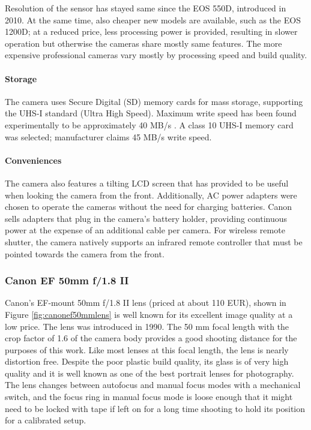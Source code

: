 Resolution of the sensor has stayed same since the EOS 550D, introduced in 2010.
At the same time, also cheaper new models are available, such as the EOS 1200D; at a reduced price, less processing power is provided, resulting in slower operation but otherwise the cameras share mostly same features.
The more expensive professional cameras vary mostly by processing speed and build quality.

\paragraph{Storage}
The camera uses Secure Digital (SD) memory cards for mass storage, supporting the UHS-I standard (Ultra High Speed).
Maximum write speed has been found experimentally to be approximately 40 MB/s \cite{magiclanternforum}.
A class 10 UHS-I memory card was selected; manufacturer claims 45 MB/s write speed.

\paragraph{Conveniences}
The camera also features a tilting LCD screen that has provided to be useful when looking the camera from the front.
Additionally, AC power adapters were chosen to operate the cameras without the need for charging batteries.
Canon sells adapters that plug in the camera's battery holder, providing continuous power at the expense of an additional cable per camera.
For wireless remote shutter, the camera natively supports an infrared remote controller that must be pointed towards the camera from the front.


\subsubsection{Canon EF 50mm f/1.8 II}

Canon's EF-mount 50mm f/1.8 II lens (priced at about 110 EUR), shown in Figure \ref{fig:canonef50mmlens} is well known for its excellent image quality at a low price.
The lens was introduced in 1990.
The 50 mm focal length with the crop factor of 1.6 of the camera body provides a good shooting distance for the purposes of this work.
Like most lenses at this focal length, the lens is nearly distortion free.
Despite the poor plastic build quality, its glass is of very high quality and it is well known as one of the best portrait lenses for photography.
The lens changes between autofocus and manual focus modes with a mechanical switch, and the focus ring in manual focus mode is loose enough that it might need to be locked with tape if left on for a long time shooting to hold its position for a calibrated setup.

